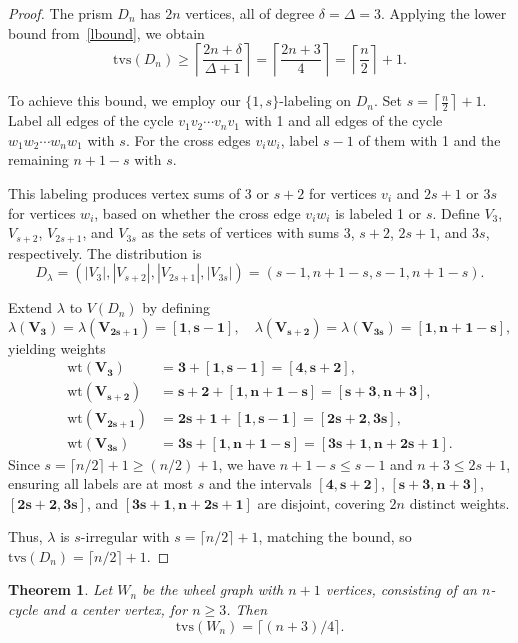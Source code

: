 \documentclass[11pt]{article}
\newtheorem{thm}{Theorem}[section]
\numberwithin{equation}{section}
\newcommand{\wt}{\mathrm{wt}}
\newcommand{\bv}[1]{\mathbf{#1}}
\begin{document}
\begin{proof}
The prism \(D_n\) has \(2n\) vertices, all of degree \(\delta = \Delta = 3\). Applying the lower bound from~\eqref{lbound}, we obtain
\[
\mathrm{tvs}(D_n) \geq \left\lceil \frac{2n + \delta}{\Delta + 1} \right\rceil = \left\lceil \frac{2n + 3}{4} \right\rceil = \left\lceil \frac{n}{2} \right\rceil + 1.
\]

To achieve this bound, we employ our \(\{1,s\}\)-labeling on \(D_n\). Set \(s = \left\lceil \frac{n}{2} \right\rceil + 1\). Label all edges of the cycle \(v_1 v_2 \cdots v_n v_1\) with 1 and all edges of the cycle \(w_1 w_2 \cdots w_n w_1\) with \(s\). For the cross edges \(v_i w_i\), label \(s - 1\) of them with 1 and the remaining \(n + 1 - s\) with \(s\).

This labeling produces vertex sums of 3 or \(s + 2\) for vertices \(v_i\) and \(2s + 1\) or \(3s\) for vertices \(w_i\), based on whether the cross edge \(v_i w_i\) is labeled 1 or \(s\). Define \(V_3\), \(V_{s+2}\), \(V_{2s+1}\), and \(V_{3s}\) as the sets of vertices with sums 3, \(s + 2\), \(2s + 1\), and \(3s\), respectively. The distribution is
\[
D_{\lambda} = (|V_3|, |V_{s+2}|, |V_{2s+1}|, |V_{3s}|) = (s - 1, n + 1 - s, s - 1, n + 1 - s).
\]

Extend \(\lambda\) to \(V(D_n)\) by defining
\[
\lambda(\bv{V_3}) = \lambda(\bv{V_{2s+1}}) = \bv{[1,s-1]}, \quad \lambda(\bv{V_{s+2}}) = \lambda(\bv{V_{3s}}) = \bv{[1,n+1-s]},
\]
yielding weights
\begin{align*}
\wt(\bv{V_3}) &= \bv{3} + \bv{[1,s-1]} = \bv{[4,s+2]}, \\
\wt(\bv{V_{s+2}}) &= \bv{s+2} + \bv{[1,n+1-s]} = \bv{[s+3,n+3]}, \\
\wt(\bv{V_{2s+1}}) &= \bv{2s+1} + \bv{[1,s-1]} = \bv{[2s+2,3s]}, \\
\wt(\bv{V_{3s}}) &= \bv{3s} + \bv{[1,n+1-s]} = \bv{[3s+1,n+2s+1]}.
\end{align*}
Since \(s = \lceil n/2 \rceil + 1 \geq (n/2) + 1\), we have \(n + 1 - s \leq s - 1\) and \(n + 3 \leq 2s + 1\), ensuring all labels are at most \(s\) and the intervals \(\bv{[4,s+2]}\), \(\bv{[s+3,n+3]}\), \(\bv{[2s+2,3s]}\), and \(\bv{[3s+1,n+2s+1]}\) are disjoint, covering \(2n\) distinct weights.

Thus, \(\lambda\) is \(s\)-irregular with \(s = \lceil n/2 \rceil + 1\), matching the bound, so \(\mathrm{tvs}(D_n) = \lceil n/2 \rceil + 1\).
\end{proof}

\begin{thm}\label{wheel}
Let \(W_n\) be the wheel graph with \(n + 1\) vertices, consisting of an \(n\)-cycle and a center vertex, for \(n \geq 3\). Then
\[
\mathrm{tvs}(W_n) = \lceil (n + 3) / 4 \rceil.
\]
\end{thm}
\end{document}

